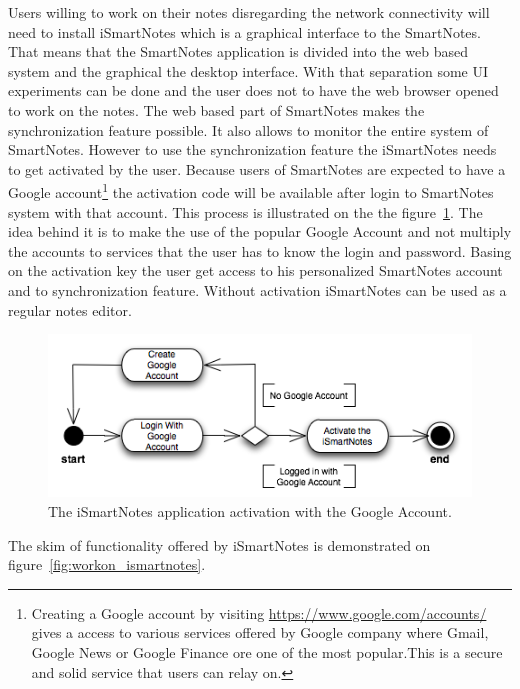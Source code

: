 Users willing to work on their notes disregarding the network connectivity will need to install iSmartNotes which is a graphical interface to the SmartNotes. That means that the SmartNotes application is divided into the web based system and the graphical the desktop interface. With that separation some UI experiments can be done and the user does not to have the web browser opened to work on the notes. The web based part of SmartNotes makes the synchronization feature possible. It also allows to monitor the entire system of SmartNotes. However to use the synchronization feature the iSmartNotes needs to get activated by the user. Because users of SmartNotes are expected to have a Google account\footnote{Creating a Google account by visiting \url{https://www.google.com/accounts/} gives a access to various services offered by Google company where Gmail, Google News or Google Finance ore one of the most popular.This is a secure and solid service that users can relay on.} the activation code will be available after login to SmartNotes system with that account. This process is illustrated on the the figure~\ref{fig:ismartnotes_activation}. The idea behind it is to make the use of the popular Google Account and not multiply the accounts to services that the user has to know the login and password. Basing on the activation key the user get access to his personalized SmartNotes account and to synchronization feature. Without activation iSmartNotes can be used as a regular notes editor.  
\begin{figure}[ht]
\begin{center}
\includegraphics[scale=0.6]{charts/activate_iSmartNotes.png}
\caption{The iSmartNotes application activation with the Google Account.}
\label{fig:ismartnotes_activation}
\end{center}
\end{figure}
The skim of functionality offered by iSmartNotes is demonstrated on figure~\ref{fig:workon_ismartnotes}.
